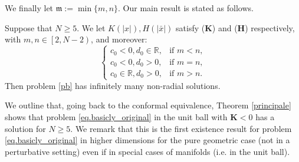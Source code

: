 \documentclass[11pt,a4paper]{amsart}
\begin{document}
We finally let $\mathfrak m:=\min\{m, n\}$. Our main result is stated as follows.
\begin{theorem}\label{principale}
Suppose that $N \geq 5$. We let $K(|x|), H(|\bar{x}|)$ satisfy ({\bf K}) and ({\bf H})  respectively, with $m, n \in\left[2,N-2\right)$, and moreover:
$$\left\{\begin{array}{ll}c_0<0,d_0\in\mathbb R,&\mbox{if }m<n,\\c_0<0,d_0>0,&\mbox{if }m=n,\\c_0\in\mathbb R,d_0>0,&\mbox{if }m>n.\end{array}\right.$$
Then problem \eqref{pb} has infinitely many non-radial solutions.
 \end{theorem}
We outline that, going back to the conformal equivalence, Theorem \ref{principale} shows that problem \eqref{eq.basicly_original} in the unit ball with $\mathbf K<0$ has a solution for $N\geq 5$. We remark that this is the first existence result for problem \eqref{eq.basicly_original} in higher dimensions for the pure geometric case (not in a perturbative setting) even if in special cases of manifolds (i.e. in the unit ball).\\ 
\end{document}
